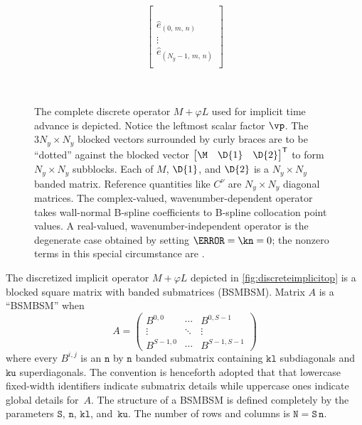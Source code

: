 \begin{sidewaysfigure}
{{{\begin{minipage}[c]{\textwidth}
\begin{align*}
\begin{bmatrix}
\\%
\\%
\\%
  \hat{e}_{\left(0,\,m,\,n\right)} \\
  \vdots \\
  \hat{e}_{\left(N_y-1,\,m,\,n\right)} \\
%
\end{bmatrix}
\end{align*}
\end{minipage}}}  %
\\
\caption[The discrete operator $M+\varphi{}L$ used for implicit time advance]
{%
    The complete discrete operator $M+\varphi{}L$ used for implicit time
    advance is depicted.  Notice the leftmost scalar factor $\bm{\vp}$.  The
    $3 N_y \times N_y$ blocked vectors surrounded by curly braces are to be
    ``dotted'' against the blocked vector $ \trans{\begin{bmatrix} \M & \D{1}
    & \D{2} \end{bmatrix}} $ to form $N_y \times N_y$ subblocks.  Each of
    $M$, $\D{1}$, and $\D{2}$ is a $N_y \times N_y$ banded matrix.  Reference
    quantities like $C^\nu$ are $N_y \times N_y$ diagonal matrices.  The
    complex-valued, wavenumber-dependent operator takes wall-normal B-spline
    coefficients to B-spline collocation point values.  A real-valued,
    wavenumber-independent operator is the degenerate case obtained by
    setting $\km=\kn=0$; the nonzero terms in this special circumstance are
    .\label{fig:discreteimplicitop}
}
}\end{sidewaysfigure}

The discretized implicit operator $M+\varphi{}L$ depicted in
\autoref{fig:discreteimplicitop} is a blocked square matrix with banded
submatrices (BSMBSM).  Matrix $A$ is a ``BSMBSM'' when
\[A = \begin{pmatrix}
    B^{0,0}  & \cdots & B^{0,S-1}   \\
    \vdots    & \ddots & \vdots       \\
    B^{S-1,0} & \cdots & B^{S-1,S-1}
\end{pmatrix}\]
where every $B^{i,j}$ is an $\mathtt{n}$ by $\mathtt{n}$ banded submatrix
containing $\mathtt{kl}$ subdiagonals and $\mathtt{ku}$ superdiagonals.
The convention is henceforth adopted that that lowercase fixed-width identifiers
indicate submatrix details while uppercase ones indicate global details for~$A$.
The structure of a BSMBSM is defined completely by the parameters
$\mathtt{S}$, $\mathtt{n}$, $\mathtt{kl}$, and~$\mathtt{ku}$.  The number of
rows and columns is $\mathtt{N} = \mathtt{S}\,\mathtt{n}$.

